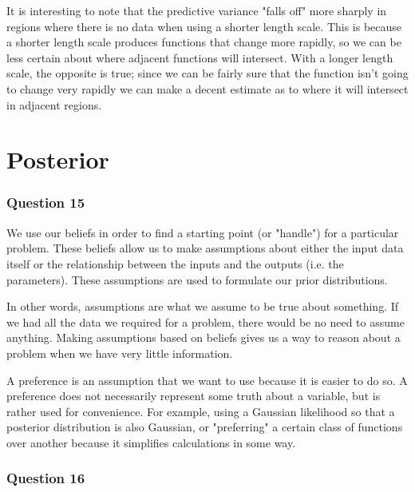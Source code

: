 \documentclass[10pt, a4paper, twocolumn]{article} %
\begin{document}
It is interesting to note that the predictive variance "falls off" more sharply in regions where there is no data when using a shorter length scale. This is because a shorter length scale produces functions that change more rapidly, so we can be less certain about where adjacent functions will intersect. With a longer length scale, the opposite is true; since we can be fairly sure that the function isn't going to change very rapidly we can make a decent estimate as to where it will intersect in adjacent regions.




\section{Posterior}

\subsubsection*{Question 15}
We use our beliefs in order to find a starting point (or "handle") for a particular problem. These beliefs allow us to make assumptions about either the input data itself or the relationship between the inputs and the outputs (i.e. the parameters). These assumptions are used to formulate our prior distributions.

In other words, assumptions are what we assume to be true about something. If we had all the data we required for a problem, there would be no need to assume anything. Making assumptions based on beliefs gives us a way to reason about a problem when we have very little information.

A preference is an assumption that we want to use because it is easier to do so. A preference does not necessarily represent some truth about a variable, but is rather used for convenience. For example, using a Gaussian likelihood so that a posterior distribution is also Gaussian, or "preferring" a certain class of functions over another because it simplifies calculations in some way.

\subsubsection*{Question 16}
\end{document}

